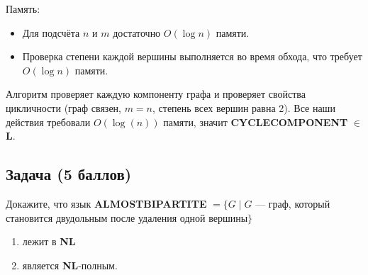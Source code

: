 \begin{solution}
\begin{enumerate}
              Память:
              \begin{itemize}
                  \item Для подсчёта $n$ и $m$ достаточно $O(\log n)$ памяти.
                  \item Проверка степени каждой вершины выполняется во время обхода, что требует $O(\log n)$ памяти.
              \end{itemize}
    \end{enumerate}

    Алгоритм проверяет каждую компоненту графа и проверяет свойства цикличности (граф связен, $m = n$, степень всех вершин равна 2).
    Все наши действия требовали $O(\log(n))$ памяти, значит \textbf{CYCLECOMPONENT} $\in$ \textbf{L}.
\end{solution}


\subsection{Задача \textbf{(5 баллов)}}

Докажите, что язык \textbf{ALMOSTBIPARTITE} $= \{G \mid G$ --- граф, который становится двудольным после удаления одной вершины$\}$
\begin{enumerate}[label=\alph*.]
    \item лежит в \textbf{NL}
    \item является \textbf{NL}-полным.
\end{enumerate}

